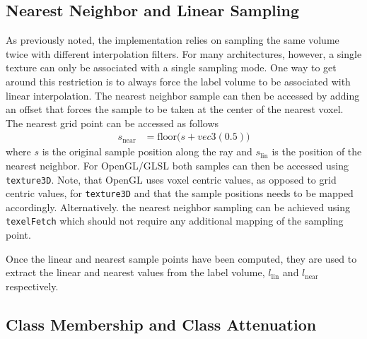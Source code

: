 \documentclass{egpubl}
\begin{document}
\subsection*{Nearest Neighbor and Linear Sampling}

As previously noted, the implementation relies on sampling the same volume twice with different interpolation filters. For many architectures, however, a single texture can only be associated with a single sampling mode. One way to get around this restriction is to always force the label volume to be associated with linear interpolation. The nearest neighbor sample can then be accessed by adding an offset that forces the sample to be taken at the center of the nearest voxel. The nearest grid point can be accessed as follows
\begin{align}
s_\mathrm{near} &= \mathrm{floor}\big(s + vec3(0.5)\big) \label{eq:near}  
\end{align}
where $s$ is the original sample position along the ray and $s_\mathrm{lin}$ is the position of the nearest neighbor. For OpenGL/GLSL both samples can then be accessed using \texttt{texture3D}. Note, that OpenGL uses voxel centric values, as opposed to grid centric values, for \texttt{texture3D} and that the sample positions needs to be mapped accordingly.
 Alternatively. the nearest neighbor sampling can be achieved using \texttt{texelFetch} which should not require any additional mapping of the sampling point.

Once the linear and nearest sample points have been computed, they are used to extract the linear and nearest values from the label volume, $l_\mathrm{lin}$ and $l_\mathrm{near}$ respectively.

\subsection*{Class Membership and Class Attenuation}
\end{document}
